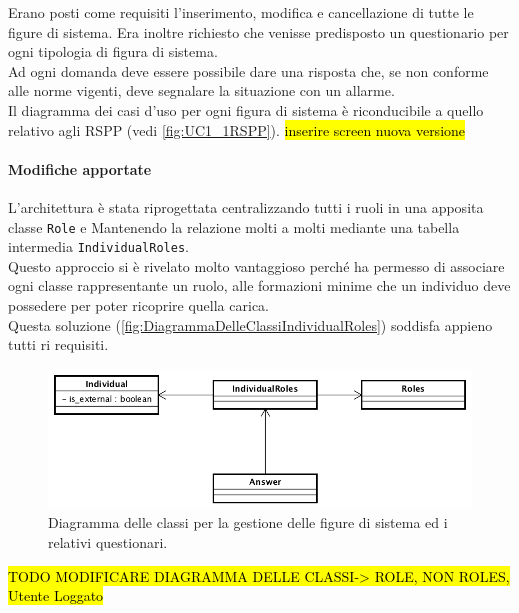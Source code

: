 	Erano posti come requisiti l'inserimento, modifica e cancellazione di tutte le figure di sistema. Era inoltre richiesto che venisse predisposto un questionario per ogni tipologia di figura di sistema. \\
	Ad ogni domanda deve essere possibile dare una risposta che, se non conforme alle norme vigenti, deve segnalare la situazione con un allarme.\\
	
	Il diagramma dei casi d'uso per ogni figura di sistema è riconducibile a quello relativo agli RSPP (vedi  \autoref{fig:UC1_1RSPP}).
	\hl{inserire screen nuova versione}
	
	
	\paragraph{Modifiche apportate}
	
	
	
	L'architettura è stata riprogettata centralizzando tutti i ruoli in una apposita classe \texttt{Role} e Mantenendo la relazione molti a molti mediante una tabella intermedia \texttt{IndividualRoles}. \\	Questo approccio si è rivelato molto vantaggioso perché ha permesso di associare ogni classe rappresentante un ruolo, alle formazioni minime che un individuo deve possedere per poter ricoprire quella carica. \\
	Questa soluzione (\autoref{fig:DiagrammaDelleClassiIndividualRoles}) soddisfa appieno tutti ri requisiti.
	
		\begin{figure}[H]
			\begin{center}
				\includegraphics[width=14cm]{Pics/UMLClassiFigureDiSistema.png}
				\caption{
					Diagramma delle classi per la gestione delle figure di sistema ed i relativi questionari.}
				\label{fig:DiagrammaDelleClassiIndividualRoles}
			\end{center}
		\end{figure}
	
	\hl{TODO MODIFICARE DIAGRAMMA DELLE CLASSI-> ROLE, NON ROLES, Utente Loggato}
	
